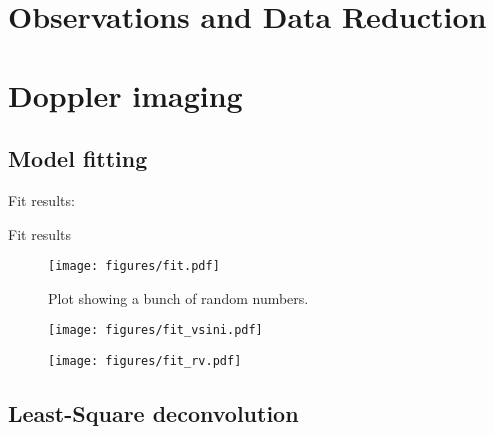 \documentclass[twocolumn]{aastex631}
\begin{document}
\section{Observations and Data Reduction}

\section{Doppler imaging}

\subsection{Model fitting}

Fit results:
\begin{table*}[ht!]
    \centering
    \caption{Fit results}
    \label{tab:my_table}
\end{table*}


\begin{figure*}[ht!]
    \begin{centering}
        \texttt{[image: figures/fit.pdf]}
        \caption{
            Plot showing a bunch of random numbers.
        }
        \label{fig:fit}
    \end{centering}
\end{figure*}

\begin{figure*}[ht!]
    \begin{centering}
    \begin{minipage}[b]{0.48\textwidth}
        \centering
        \texttt{[image: figures/fit\_vsini.pdf]}
        \label{fig:fit_vsini}
    \end{minipage}
    \hfill
    \begin{minipage}[b]{0.48\textwidth}
        \centering
        \texttt{[image: figures/fit\_rv.pdf]}
        \label{fig:fit_rv}
    \end{minipage}
    \end{centering}
\end{figure*}


\subsection{Least-Square deconvolution}
\end{document}

